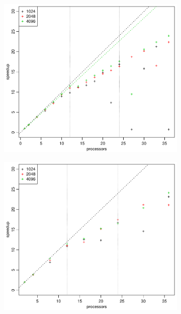 \\
%
\begin{figure}[h!]
  \centering
  \begin{subfigure}[b]{0.48\textwidth}
    \includegraphics[width=\textwidth]{./Figures/taskbSpeedupProc1.pdf}
  \end{subfigure}%
  \quad
  \begin{subfigure}[b]{0.48\textwidth}
    \includegraphics[width=\textwidth]{./Figures/taskbSpeedupProc2.pdf}
  \end{subfigure}

\end{figure}

